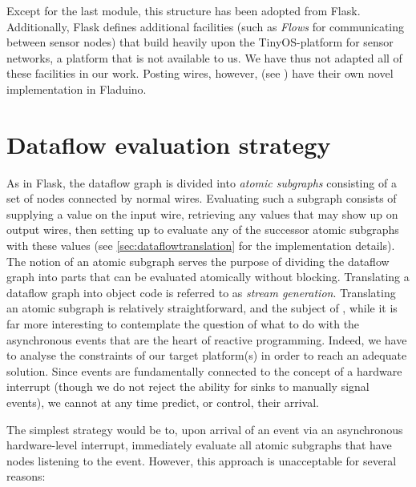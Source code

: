 \documentclass[a4paper, oneside, final]{memoir}
\let\Fref\undefined
\begin{document}
Except for the last module, this structure has been adopted from
Flask.  Additionally, Flask defines additional facilities (such as
\textit{Flows} for communicating between sensor nodes) that build
heavily upon the TinyOS-platform for sensor networks, a platform that
is not available to us.  We have thus not adapted all of these
facilities in our work.  Posting wires, however, (see
\Fref{sec:posting wires}) have their own novel implementation in
Fladuino.

\section{Dataflow evaluation strategy}
\label{sec:dataflowevaluationstrategy}
As in Flask, the dataflow graph is divided into \textit{atomic
  subgraphs} consisting of a set of nodes connected by normal wires.
Evaluating such a subgraph consists of supplying a value on the input
wire, retrieving any values that may show up on output wires, then
setting up to evaluate any of the successor atomic subgraphs with
these values (see \ref{sec:dataflowtranslation} for the implementation
details).  The notion of an atomic subgraph serves the purpose of
dividing the dataflow graph into parts that can be evaluated
atomically without blocking.  Translating a dataflow graph into object
code is referred to as \textit{stream generation}.  Translating an
atomic subgraph is relatively straightforward, and the subject of
\Fref{sec:dataflowtranslation}, while it is far more interesting to
contemplate the question of what to do with the asynchronous events
that are the heart of reactive programming.  Indeed, we have to
analyse the constraints of our target platform(s) in order to reach an
adequate solution.  Since events are fundamentally connected to the
concept of a hardware interrupt (though we do not reject the ability
for sinks to manually signal events), we cannot at any time predict,
or control, their arrival.

The simplest strategy would be to, upon arrival of an event via an
asynchronous hardware-level interrupt, immediately evaluate all atomic
subgraphs that have nodes listening to the event.  However, this
approach is unacceptable for several reasons:
\end{document}
